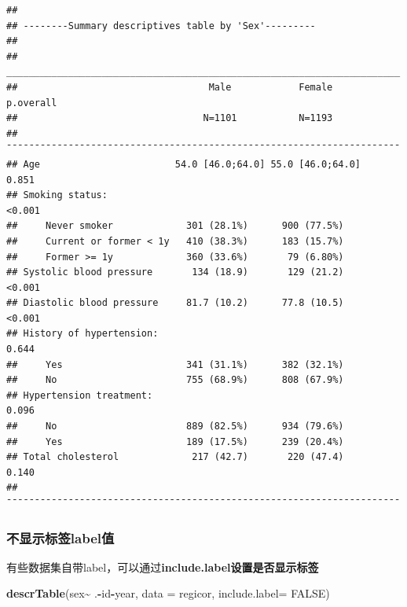 \documentclass[
]{article}
\newenvironment{Shaded}{\begin{snugshade}}{\end{snugshade}}
\newcommand{\AttributeTok}[1]{\textcolor[rgb]{0.13,0.29,0.53}{#1}}
\newcommand{\ConstantTok}[1]{\textcolor[rgb]{0.56,0.35,0.01}{#1}}
\newcommand{\FunctionTok}[1]{\textcolor[rgb]{0.13,0.29,0.53}{\textbf{#1}}}
\newcommand{\NormalTok}[1]{#1}
\newcommand{\SpecialCharTok}[1]{\textcolor[rgb]{0.81,0.36,0.00}{\textbf{#1}}}
\newcommand{\StringTok}[1]{\textcolor[rgb]{0.31,0.60,0.02}{#1}}
\begin{document}
\begin{verbatim}
## 
## --------Summary descriptives table by 'Sex'---------
## 
## ______________________________________________________________________ 
##                                  Male            Female      p.overall 
##                                 N=1101           N=1193                
## ¯¯¯¯¯¯¯¯¯¯¯¯¯¯¯¯¯¯¯¯¯¯¯¯¯¯¯¯¯¯¯¯¯¯¯¯¯¯¯¯¯¯¯¯¯¯¯¯¯¯¯¯¯¯¯¯¯¯¯¯¯¯¯¯¯¯¯¯¯¯ 
## Age                        54.0 [46.0;64.0] 55.0 [46.0;64.0]   0.851   
## Smoking status:                                               <0.001   
##     Never smoker             301 (28.1%)      900 (77.5%)              
##     Current or former < 1y   410 (38.3%)      183 (15.7%)              
##     Former >= 1y             360 (33.6%)       79 (6.80%)              
## Systolic blood pressure       134 (18.9)       129 (21.2)     <0.001   
## Diastolic blood pressure     81.7 (10.2)      77.8 (10.5)     <0.001   
## History of hypertension:                                       0.644   
##     Yes                      341 (31.1%)      382 (32.1%)              
##     No                       755 (68.9%)      808 (67.9%)              
## Hypertension treatment:                                        0.096   
##     No                       889 (82.5%)      934 (79.6%)              
##     Yes                      189 (17.5%)      239 (20.4%)              
## Total cholesterol             217 (42.7)       220 (47.4)      0.140   
## ¯¯¯¯¯¯¯¯¯¯¯¯¯¯¯¯¯¯¯¯¯¯¯¯¯¯¯¯¯¯¯¯¯¯¯¯¯¯¯¯¯¯¯¯¯¯¯¯¯¯¯¯¯¯¯¯¯¯¯¯¯¯¯¯¯¯¯¯¯¯
\end{verbatim}

\subsubsection{\texorpdfstring{\textbf{不显示标签label值}}{不显示标签label值}}\label{ux4e0dux663eux793aux6807ux7b7elabelux503c}

有些数据集自带label，可以通过\textbf{include.label设置是否显示标签}

\begin{Shaded}
\begin{Highlighting}[]
\FunctionTok{descrTable}\NormalTok{(}\StringTok{\textasciigrave{}}\AttributeTok{sex}\StringTok{\textasciigrave{}}\SpecialCharTok{\textasciitilde{}}\NormalTok{ .}\SpecialCharTok{{-}}\NormalTok{id}\SpecialCharTok{{-}}\NormalTok{year, }\AttributeTok{data =}\NormalTok{ regicor, }\AttributeTok{include.label=} \ConstantTok{FALSE}\NormalTok{)}
\end{Highlighting}
\end{Shaded}
\end{document}
